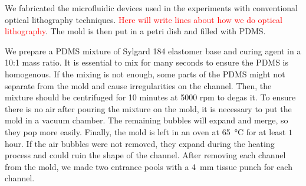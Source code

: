 We fabricated the microfluidic devices used in the experiments with conventional optical lithography techniques. \textcolor{red}{Here will write lines about how we do optical lithography}. The mold is then put in a petri dish and filled with PDMS. 


We prepare a PDMS mixture of Sylgard 184 elastomer base and curing agent in a 10:1 mass ratio. It is essential to mix for many seconds to ensure the PDMS is homogenous. If the mixing is not enough, some parts of the PDMS might not separate from the mold and cause irregularities on the channel. Then, the mixture should be centrifuged for 10 minutes at 5000 rpm to degas it. To ensure there is no air after pouring the mixture on the mold, it is necessary to put the mold in a vacuum chamber. The remaining bubbles will expand and merge, so they pop more easily. Finally, the mold is left in an oven at \SI{65}{\degreeCelsius} for at least $1$ hour. If the air bubbles were not removed, they expand during the heating process and could ruin the shape of the channel. After removing each channel from the mold, we made two entrance pools with a \SI{4}{\milli\meter} tissue punch for each channel.

